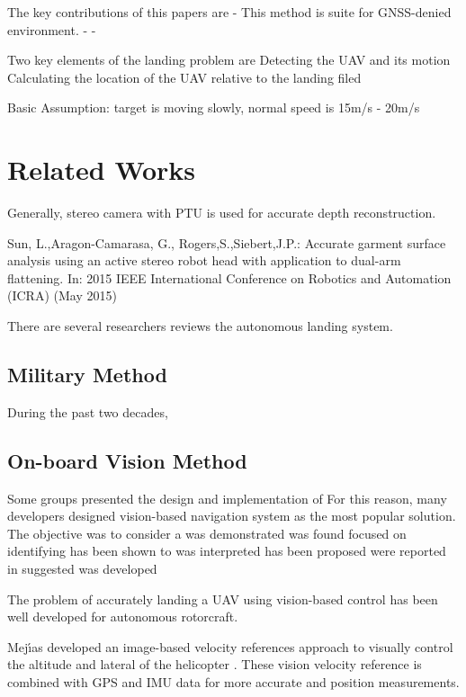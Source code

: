The key contributions of this papers are
- This method is suite for GNSS-denied environment.
- 
- 


Two key elements of the landing problem are
Detecting the UAV and its motion
Calculating the location of the UAV relative to the landing filed

Basic Assumption:
target is moving slowly, normal speed is 15m/s - 20m/s




\section{Related Works}





Generally, stereo camera with PTU is used for accurate depth reconstruction.

Sun, L.,Aragon-Camarasa, G., Rogers,S.,Siebert,J.P.: Accurate garment surface analysis using an active stereo robot head with application to dual-arm ﬂattening. In: 2015 IEEE International
Conference on Robotics and Automation (ICRA) (May 2015)

There are several researchers reviews the autonomous landing system.


\subsection{Military Method}
During the past two decades,



\subsection{On-board Vision Method}

Some groups presented the design and implementation of  
For this reason, many developers designed vision-based navigation system as the most popular solution.
The objective was to consider a 
was demonstrated
was found
focused on identifying
has been shown to
was interpreted
has been proposed
were reported in
suggested
was developed

The problem of accurately landing a UAV using vision-based control has been well developed for autonomous rotorcraft. 


Mej{\'{\i}}as developed an image-based velocity references approach to visually control the altitude and lateral of the helicopter \cite{Mejias2006}. These vision velocity reference is combined with GPS and IMU data for more accurate and position measurements.

